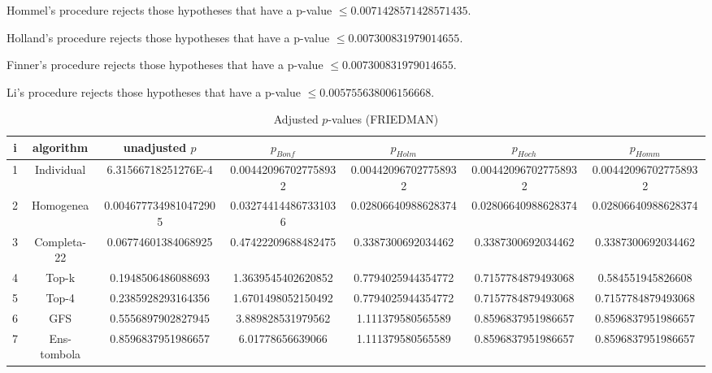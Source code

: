 \documentclass[a4paper,10pt]{article}
\begin{document}
\begin{landscape}
Hommel's procedure rejects those hypotheses that have a p-value $\le0.0071428571428571435$.


Holland's procedure rejects those hypotheses that have a p-value $\le0.007300831979014655$.


Finner's procedure rejects those hypotheses that have a p-value $\le0.007300831979014655$.


Li's procedure rejects those hypotheses that have a p-value $\le0.005755638006156668$.



\newpage

\begin{table}[!htp]
\centering\scriptsize
\caption{Adjusted $p$-values (FRIEDMAN)}
\begin{tabular}{ccccccc}
i&algorithm&unadjusted $p$&$p_{Bonf}$&$p_{Holm}$&$p_{Hoch}$&$p_{Homm}$\\
\hline
1&Individual&6.31566718251276E-4&0.004420967027758932&0.004420967027758932&0.004420967027758932&0.004420967027758932\\
2&Homogenea&0.0046777349810472905&0.032744144867331036&0.02806640988628374&0.02806640988628374&0.02806640988628374\\
3&Completa-22&0.06774601384068925&0.47422209688482475&0.3387300692034462&0.3387300692034462&0.3387300692034462\\
4&Top-k&0.1948506486088693&1.3639545402620852&0.7794025944354772&0.7157784879493068&0.584551945826608\\
5&Top-4&0.2385928293164356&1.6701498052150492&0.7794025944354772&0.7157784879493068&0.7157784879493068\\
6&GFS&0.5556897902827945&3.889828531979562&1.111379580565589&0.8596837951986657&0.8596837951986657\\
7&Ens-tombola&0.8596837951986657&6.01778656639066&1.111379580565589&0.8596837951986657&0.8596837951986657\\
\hline
\end{tabular}
\end{table}


\end{landscape}
\end{document}
